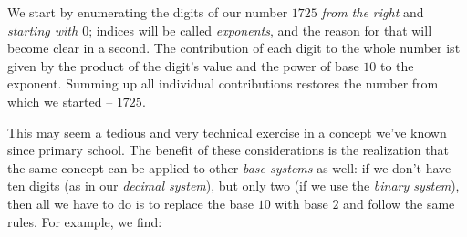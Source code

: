 We start by enumerating the digits of our number $1725$ \emph{from the right} and \emph{starting with $0$}; indices will be called \emph{exponents}, and the reason for that will become clear in a second. The contribution of each digit to the whole number ist given by the product of the digit's value and the power of base $10$ to the exponent. Summing up all individual contributions restores the number from which we started -- $1725$.

This may seem a tedious and very technical exercise in a concept we've known since primary school. The benefit of these considerations is the realization that the same concept can be applied to other \emph{base systems} as well: if we don't have ten digits (as in our \emph{decimal system}), but only two (\ie if we use the \emph{binary system}), then all we have to do is to replace the base $10$ with base $2$ and follow the same rules. For example, we find:

